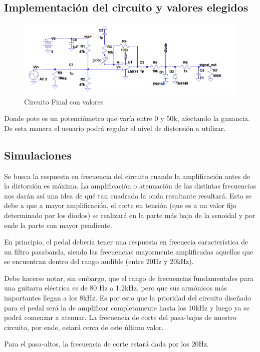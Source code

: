 \documentclass[../../main.tex]{subfiles}
\begin{document}
\subsection{Implementación del circuito y valores elegidos}
\begin{figure}[H]
	\centering
	\includegraphics[scale=1]{imagenes/circuito_final.png}
	\caption{Circuito Final con valores}
	\label{fig:ej5_circuito_final}
\end{figure}

Donde pote es un potenciómetro que varía entre 0 y 50k, afectando la ganancia. De esta manera el usuario podrá regular el nivel de distorsión a utilizar.

\subsection{Simulaciones}

Se busca la respuesta en frecuencia del circuito cuando la amplificación antes de la distorsión es máxima. La amplificación o atenuación de las distintas frecuencias nos darán así una idea de qué tan cuadrada la onda resultante resultará. Esto se debe a que a mayor amplificación, el corte en tensión (que es a un valor fijo determinado por los diodos) se realizará en la parte más baja de la senoidal y por ende la parte con mayor pendiente. \par
En principio, el pedal debería tener una respuesta en frecuecia característica de un filtro pasabanda, siendo las frecuencias mayormente amplificadas aquellas que se encuentran dentro del rango audible (entre 20Hz y 20kHz).\par
Debe hacerse notar, sin embargo, que el rango de frecuencias fundamentales para una guitarra eléctrica es de 80 Hz a 1.2kHz, pero que sus armónicos más importantes llegan a los 8kHz. Es por esto que la prioridad del circuito diseñado para el pedal será la de amplificar completamente hasta los 10kHz y luego ya se podrá comenzar a atenuar. La frecuencia de corte del pasa-bajos de nuestro circuito, por ende, estará cerca de este último valor.\par
Para el pasa-altos, la frecuencia de corte estará dada por los 20Hz.
\end{document}
